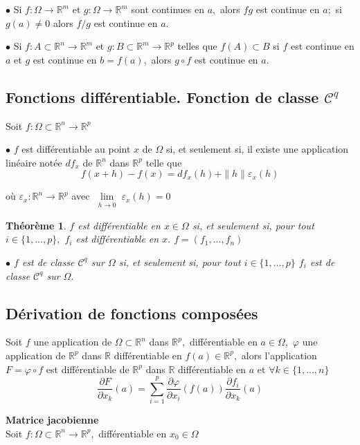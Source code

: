 \documentclass[11pt,a4paper]{report}
\newtheorem{theorem}{Théorème}[section]
\begin{document}
$\bullet$ Si $f:\Omega\rightarrow \mathbb{R}^m$ et $g:\Omega\rightarrow \mathbb{R}^m$ sont continues en $a,$ alors $fg$ est continue en $a;$ si $g(a)\neq 0$ alors $f/g$ est continue en $a.$

$\bullet$ Si $f:A\subset \mathbb{R}^n\rightarrow \mathbb{R}^m$ et $g:B\subset \mathbb{R}^m\rightarrow \mathbb{R}^p$ telles que $f(A)\subset B$ si $f$ est continue en $a$ et $g$ est continue en $b=f(a),$ alors $g\circ f$ est continue en $a.$

\subsection{Fonctions différentiable. Fonction de classe $\mathscr{C}^q$}
Soit $f:\Omega\subset \mathbb{R}^n\rightarrow\mathbb{R}^p$

$\bullet$ $f$ est différentiable au point $x$ de $\Omega$ si, et seulement si, il existe une application linéaire notée $df_x$ de $\mathbb{R}^n$ dans $\mathbb{R}^p$ telle que
$$f(x+h)-f(x)=df_x(h)+\|h\|\varepsilon_x(h)$$

où $\varepsilon_x:\mathbb{R}^n\rightarrow \mathbb{R}^p$ avec $\lim\limits_{\substack{h \rightarrow 0}}\varepsilon_x(h)=0$
\begin{theorem}
$f$ est différentiable en $x\in \Omega$ si, et seulement si, pour tout $i\in \{1,...,p\},$ $f_i$ est différentiable en $x.$ $f=(f_1,...,f_n)$

$\bullet$ $f$ est de classe $\mathscr{C}^{q}$ sur $\Omega$ si, et seulement si, pour tout $i\in \{1,...,p\}$ $f_i$ est de classe $\mathscr{C}^q$ sur $\Omega.$
\end{theorem}
\subsection{Dérivation de fonctions composées}

Soit $f$ une application de $\Omega\subset\mathbb{R}^n$ dans $\mathbb{R}^p,$ différentiable en $a\in \Omega,$ $\varphi$ une application de $\mathbb{R}^p$ dans $\mathbb{R}$ différentiable en $f(a)\in \mathbb{R}^p,$ alors l'application $F=\varphi\circ f$ est différentiable de $\mathbb{R}^p$ dans $\mathbb{R}$ différentiable en $a$ et $\forall k\in \{1,...,n\}$
$$\frac{\partial F}{\partial x_k}(a)=\sum\limits_{i=1}^{p}\frac{\partial \varphi}{\partial x_i}(f(a))\frac{\partial f_i}{\partial x_k}(a)$$

\textbf{Matrice jacobienne}\\

Soit $f:\Omega\subset \mathbb{R}^n\rightarrow\mathbb{R}^p,$ différentiable en $x_0\in \Omega$
\end{document}
